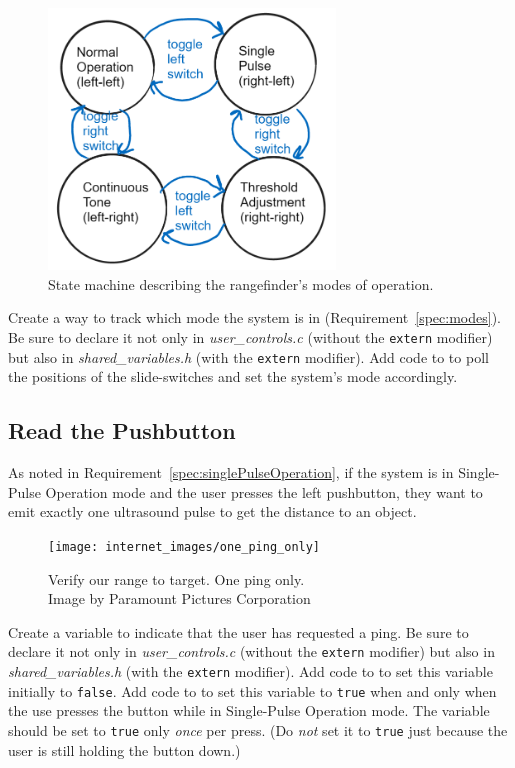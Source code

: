 \begin{figure}[h]
    \centering
    \includegraphics[width=3in]{modeStateMachine}
    \caption{\label{fig:modeStateMachine} State machine describing the rangefinder's modes of operation.}
\end{figure}

Create a way to track which mode the system is in (Requirement~\ref{spec:modes}).
Be sure to declare it not only in \textit{user\_controls.c} (without the \lstinline{extern} modifier) but also in \textit{shared\_variables.h} (with the \lstinline{extern} modifier).
Add code to  to poll the positions of the slide-switches and set the system's mode accordingly.

\subsection{Read the Pushbutton} \label{subsec:readPushbutton}

As noted in Requirement~\ref{spec:singlePulseOperation}, if the system is in Single-Pulse Operation mode and the user presses the left pushbutton, they want to emit exactly one ultrasound pulse to get the distance to an object.
\begin{figure}[h]
    \centering
    \texttt{[image: internet\_images/one\_ping\_only]}
    \caption{Verify our range to target. One ping only. \\ \tiny Image by Paramount Pictures Corporation \label{fig:onePingOnly}}
\end{figure}

Create a variable to indicate that the user has requested a ping.
Be sure to declare it not only in \textit{user\_controls.c} (without the \lstinline{extern} modifier) but also in \textit{shared\_variables.h} (with the \lstinline{extern} modifier).
Add code to  to set this variable initially to \lstinline{false}.
Add code to  to set this variable to \lstinline{true} when and only when the use presses the button while in Single-Pulse Operation mode.
The variable should be set to \lstinline{true} only \textit{once} per press.
(Do \textit{not} set it to \lstinline{true} just because the user is still holding the button down.)

